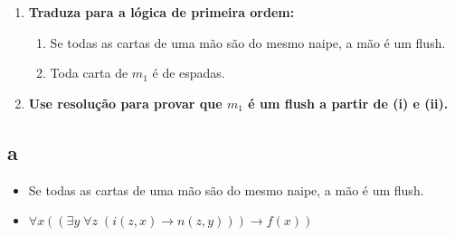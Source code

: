 \documentclass{article}
\begin{document}
\begin{enumerate}
    \item[(a)] \textbf{Traduza para a lógica de primeira ordem:}
    \begin{enumerate}
        \item[(i)] Se todas as cartas de uma mão são do mesmo naipe, a mão é um flush.
        \item[(ii)] Toda carta de $m_1$ é de espadas.
    \end{enumerate}
    \item[(b)] \textbf{Use resolução para provar que $m_1$ é um flush a partir de (i) e (ii).}
\end{enumerate}

\subsection*{a}
\begin{itemize}
    \item Se todas as cartas de uma mão são do mesmo naipe, a mão é um flush.
    \item $\forall x \left( \left( \exists y \; \forall z \; (i(z, x) \rightarrow n(z, y)) \right) \rightarrow f(x) \right)$
\end{itemize}
\end{document}
